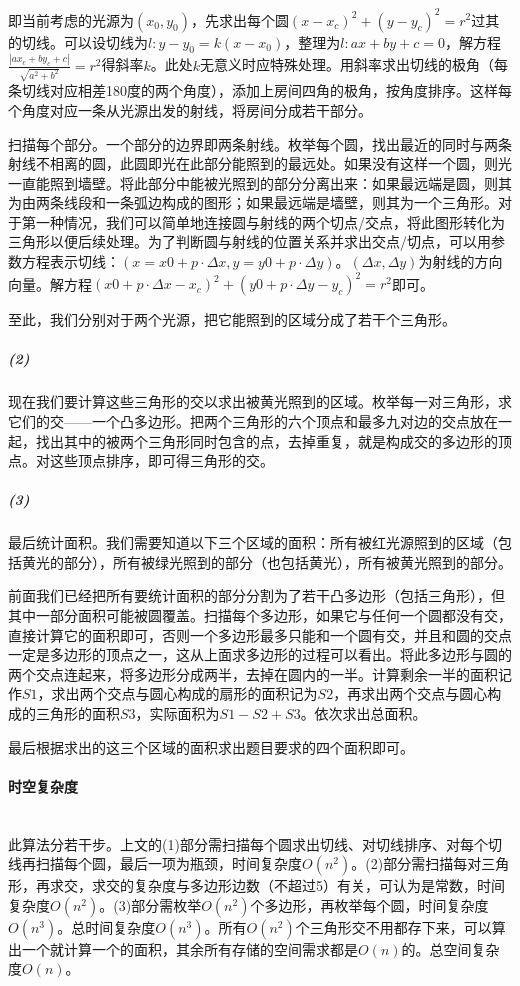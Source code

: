 \documentclass[UTF8]{ctexart}
\newcommand{\myparagraph}[1]{\paragraph{#1}\mbox{}\\}
\theoremstyle{nonumberplain}
\begin{document}
			即当前考虑的光源为$(x_0,y_0)$，先求出每个圆$(x-x_c)^2+(y-y_c)^2=r^2$过其的切线。可以设切线为$l:y-y_0=k(x-x_0)$，整理为$l:ax+by+c=0$，解方程$\frac{|ax_c+by_c+c|}{\sqrt{a^2+b^2}}=r^2$得斜率$k$。此处$k$无意义时应特殊处理。用斜率求出切线的极角（每条切线对应相差180度的两个角度），添加上房间四角的极角，按角度排序。这样每个角度对应一条从光源出发的射线，将房间分成若干部分。
			
			扫描每个部分。一个部分的边界即两条射线。枚举每个圆，找出最近的同时与两条射线不相离的圆，此圆即光在此部分能照到的最远处。如果没有这样一个圆，则光一直能照到墙壁。将此部分中能被光照到的部分分离出来：如果最远端是圆，则其为由两条线段和一条弧边构成的图形；如果最远端是墙壁，则其为一个三角形。对于第一种情况，我们可以简单地连接圆与射线的两个切点/交点，将此图形转化为三角形以便后续处理。为了判断圆与射线的位置关系并求出交点/切点，可以用参数方程表示切线：$(x=x0+p \cdot \Delta x, y=y0+p \cdot \Delta y)$。$(\Delta x, \Delta y)$为射线的方向向量。解方程$(x0+p \cdot \Delta x-x_c)^2+(y0+p \cdot \Delta y-y_c)^2=r^2$即可。
			
			至此，我们分别对于两个光源，把它能照到的区域分成了若干个三角形。
			
			\subparagraph{(2)}
			现在我们要计算这些三角形的交以求出被黄光照到的区域。枚举每一对三角形，求它们的交——一个凸多边形。把两个三角形的六个顶点和最多九对边的交点放在一起，找出其中的被两个三角形同时包含的点，去掉重复，就是构成交的多边形的顶点。对这些顶点排序，即可得三角形的交。
			
			\subparagraph{(3)}
			最后统计面积。我们需要知道以下三个区域的面积：所有被红光源照到的区域（包括黄光的部分），所有被绿光照到的部分（也包括黄光），所有被黄光照到的部分。
			
			前面我们已经把所有要统计面积的部分分割为了若干凸多边形（包括三角形），但其中一部分面积可能被圆覆盖。扫描每个多边形，如果它与任何一个圆都没有交，直接计算它的面积即可，否则一个多边形最多只能和一个圆有交，并且和圆的交点一定是多边形的顶点之一，这从上面求多边形的过程可以看出。将此多边形与圆的两个交点连起来，将多边形分成两半，去掉在圆内的一半。计算剩余一半的面积记作$S1$，求出两个交点与圆心构成的扇形的面积记为$S2$，再求出两个交点与圆心构成的三角形的面积$S3$，实际面积为$S1-S2+S3$。依次求出总面积。
			
			最后根据求出的这三个区域的面积求出题目要求的四个面积即可。
		
		\myparagraph{时空复杂度}
		
			此算法分若干步。上文的(1)部分需扫描每个圆求出切线、对切线排序、对每个切线再扫描每个圆，最后一项为瓶颈，时间复杂度$O(n^2)$。(2)部分需扫描每对三角形，再求交，求交的复杂度与多边形边数（不超过5）有关，可认为是常数，时间复杂度$O(n^2)$。(3)部分需枚举$O(n^2)$个多边形，再枚举每个圆，时间复杂度$O(n^3)$。总时间复杂度$O(n^3)$。所有$O(n^2)$个三角形交不用都存下来，可以算出一个就计算一个的面积，其余所有存储的空间需求都是$O(n)$的。总空间复杂度$O(n)$。
	
\end{document}
